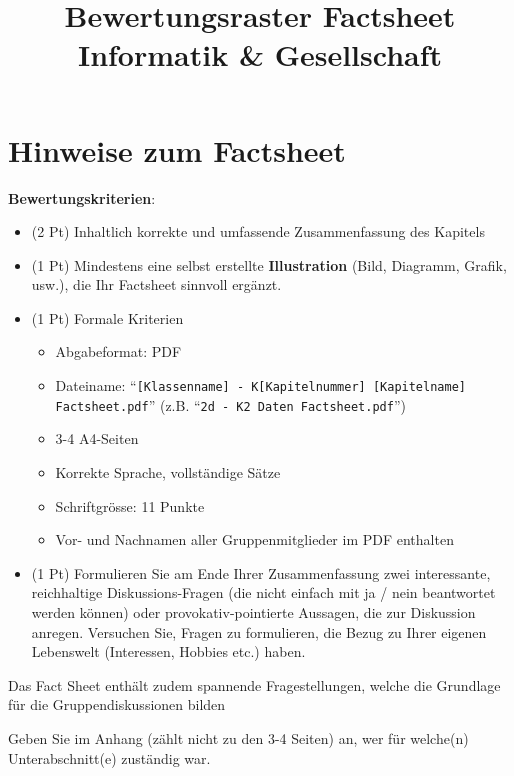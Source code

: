 \title{Bewertungsraster Factsheet\\ \large Informatik \& Gesellschaft}

\maketitle

\section*{Hinweise zum Factsheet}

\textbf{Bewertungskriterien}:
\begin{itemize}
    \item (2 Pt) Inhaltlich korrekte und umfassende Zusammenfassung des Kapitels
    \item (1 Pt) Mindestens eine selbst erstellte \textbf{Illustration} (Bild, Diagramm, Grafik, usw.), die Ihr Factsheet sinnvoll ergänzt.
    \item (1 Pt) Formale Kriterien
    \begin{itemize}
        \item Abgabeformat: PDF
        \item Dateiname: ``\texttt{[Klassenname] - K[Kapitelnummer] [Kapitelname] Factsheet.pdf}'' (z.B. ``\texttt{2d - K2 Daten Factsheet.pdf}'')
        \item 3-4 A4-Seiten
        \item Korrekte Sprache, vollständige Sätze
        \item Schriftgrösse: 11 Punkte
        \item Vor- und Nachnamen aller Gruppenmitglieder im PDF enthalten
    \end{itemize}
    \item (1 Pt) Formulieren Sie am Ende Ihrer Zusammenfassung zwei interessante, reichhaltige Diskussions-Fragen (die nicht einfach mit ja / nein beantwortet werden können) oder provokativ-pointierte Aussagen, die zur Diskussion anregen. Versuchen Sie, Fragen zu formulieren, die Bezug zu Ihrer eigenen Lebenswelt (Interessen, Hobbies etc.) haben.
\end{itemize}


Das Fact Sheet enthält zudem spannende Fragestellungen, welche die Grundlage für die Gruppendiskussionen bilden

Geben Sie im Anhang (zählt nicht zu den 3-4 Seiten) an, wer für welche(n) Unterabschnitt(e) zuständig war.

\vspace{1em}

